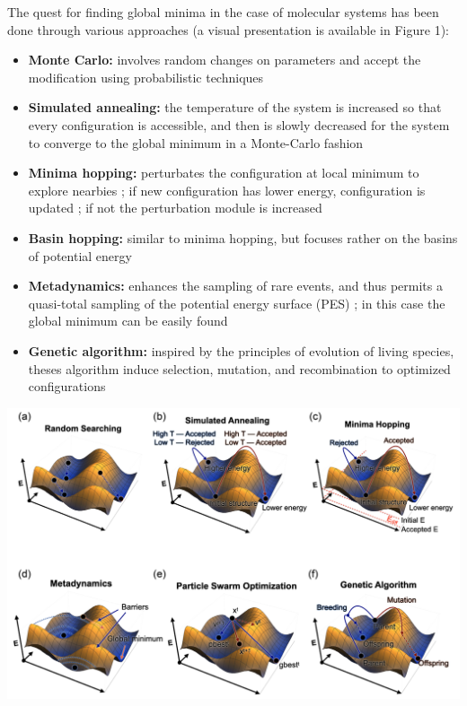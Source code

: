\documentclass[11pt]{article}
\begin{document}
\begin{multicols}{2}
\noindent The quest for finding global minima in the case of molecular systems has been done through various approaches (a visual presentation is available in Figure 1):
\begin{itemize}
    \itemsep0em
    \item \textbf{Monte Carlo:} involves random changes on parameters and accept the modification using probabilistic techniques \cite{PhysRevB.95.144104}
    \item \textbf{Simulated annealing:} the temperature of the system is increased so that every configuration is accessible, and then is slowly decreased for the system to converge to the global minimum in a Monte-Carlo fashion
    \item \textbf{Minima hopping:} perturbates the configuration at local minimum to explore nearbies ; if new configuration has lower energy, configuration is updated ; if not the perturbation module is increased
    \item \textbf{Basin hopping:} similar to minima hopping, but focuses rather on the basins of potential energy
    \item \textbf{Metadynamics:} enhances the sampling of rare events, and thus permits a quasi-total sampling of the potential energy surface (PES) ; in this case the global minimum can be easily found
    \item \textbf{Genetic algorithm:} inspired by the principles of evolution of living species, theses algorithm induce selection, mutation, and recombination to optimized configurations
\end{itemize}
\bigskip

              \noindent \includegraphics[width=\columnwidth]{figures/optim_figures.png}
                \medskip


\end{multicols}
\end{document}
